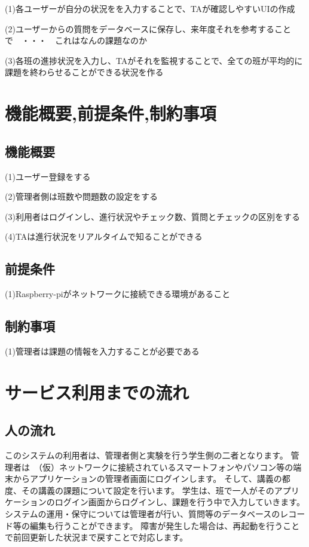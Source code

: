 \documentclass[a4j,titlepage]{ujarticle}
\begin{document}
(1)各ユーザーが自分の状況をを入力することで、TAが確認しやすいUIの作成

(2)ユーザーからの質問をデータベースに保存し、来年度それを参考することで　・・・　これはなんの課題なのか

(3)各班の進捗状況を入力し、TAがそれを監視することで、全ての班が平均的に課題を終わらせることができる状況を作る

\section{機能概要,前提条件,制約事項}

\subsection{機能概要}

(1)ユーザー登録をする

(2)管理者側は班数や問題数の設定をする

(3)利用者はログインし、進行状況やチェック数、質問とチェックの区別をする

(4)TAは進行状況をリアルタイムで知ることができる
\subsection{前提条件}

(1)Raspberry-piがネットワークに接続できる環境があること


\subsection{制約事項}

(1)管理者は課題の情報を入力することが必要である

\section{サービス利用までの流れ}
\subsection{人の流れ}
このシステムの利用者は、管理者側と実験を行う学生側の二者となります。
管理者は　（仮）ネットワークに接続されているスマートフォンやパソコン等の端末からアプリケーションの管理者画面にログインします。
そして、講義の都度、その講義の課題について設定を行います。
学生は、班で一人がそのアプリケーションのログイン画面からログインし、課題を行う中で入力していきます。
システムの運用・保守については管理者が行い、質問等のデータベースのレコード等の編集も行うことができます。
障害が発生した場合は、再起動を行うことで前回更新した状況まで戻すことで対応します。
\end{document}
